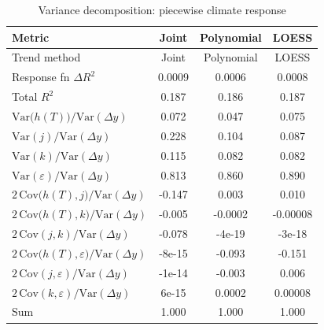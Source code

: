 \begin{table}[htbp]
\centering
\caption{Variance decomposition: piecewise climate response}
\label{tab:variance_decomp_piecewise}

\small
\begin{tabular}{@{}lccc@{}}
\toprule
Metric & Joint & Polynomial & LOESS \\
\midrule
Trend method & Joint & Polynomial & LOESS \\
\midrule
Response fn $\Delta R^2$ & 0.0009 & 0.0006 & 0.0008 \\
Total $R^2$ & 0.187 & 0.186 & 0.187 \\
\midrule
$\mathrm{Var}\!\big(h(T)\big)/\mathrm{Var}(\Delta y)$ & 0.072 & 0.047 & 0.075 \\
$\mathrm{Var}(j)/\mathrm{Var}(\Delta y)$ & 0.228 & 0.104 & 0.087 \\
$\mathrm{Var}(k)/\mathrm{Var}(\Delta y)$ & 0.115 & 0.082 & 0.082 \\
$\mathrm{Var}(\varepsilon)/\mathrm{Var}(\Delta y)$ & 0.813 & 0.860 & 0.890 \\
\midrule
$2\,\mathrm{Cov}\!\big(h(T),j\big)/\mathrm{Var}(\Delta y)$ & -0.147 & 0.003 & 0.010 \\
$2\,\mathrm{Cov}\!\big(h(T),k\big)/\mathrm{Var}(\Delta y)$ & -0.005 & -0.0002 & -0.00008 \\
$2\,\mathrm{Cov}(j,k)/\mathrm{Var}(\Delta y)$ & -0.078 & -4e-19 & -3e-18 \\
$2\,\mathrm{Cov}\!\big(h(T),\varepsilon\big)/\mathrm{Var}(\Delta y)$ & -8e-15 & -0.093 & -0.151 \\
$2\,\mathrm{Cov}(j,\varepsilon)/\mathrm{Var}(\Delta y)$ & -1e-14 & -0.003 & 0.006 \\
$2\,\mathrm{Cov}(k,\varepsilon)/\mathrm{Var}(\Delta y)$ & 6e-15 & 0.0002 & 0.00008 \\
\midrule
Sum & 1.000 & 1.000 & 1.000 \\
\bottomrule
\end{tabular}
\end{table}